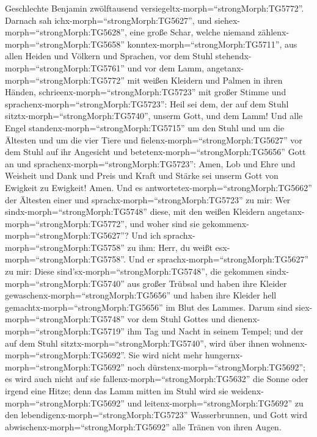 Geschlechte Benjamin zwölftausend
versiegeltx-morph=``strongMorph:TG5772''.  Darnach sah
ichx-morph=``strongMorph:TG5627'', und
siehex-morph=``strongMorph:TG5628'', eine große Schar, welche niemand
zählenx-morph=``strongMorph:TG5658''
konntex-morph=``strongMorph:TG5711'', aus allen Heiden und Völkern und
Sprachen, vor dem Stuhl stehendx-morph=``strongMorph:TG5761'' und vor
dem Lamm, angetanx-morph=``strongMorph:TG5772'' mit weißen Kleidern und
Palmen in ihren Händen, 
schrieenx-morph=``strongMorph:TG5723'' mit großer Stimme und
sprachenx-morph=``strongMorph:TG5723'': Heil sei dem, der auf dem Stuhl
sitztx-morph=``strongMorph:TG5740'', unserm Gott, und dem Lamm!
 Und alle Engel standenx-morph=``strongMorph:TG5715'' um
den Stuhl und um die Ältesten und um die vier Tiere und
fielenx-morph=``strongMorph:TG5627'' vor dem Stuhl auf ihr Angesicht und
betetenx-morph=``strongMorph:TG5656'' Gott an  und
sprachenx-morph=``strongMorph:TG5723'': Amen, Lob und Ehre und Weisheit
und Dank und Preis und Kraft und Stärke sei unserm Gott von Ewigkeit zu
Ewigkeit! Amen.  Und es
antwortetex-morph=``strongMorph:TG5662'' der Ältesten einer und
sprachx-morph=``strongMorph:TG5723'' zu mir: Wer
sindx-morph=``strongMorph:TG5748'' diese, mit den weißen Kleidern
angetanx-morph=``strongMorph:TG5772'', und woher sind sie
gekommenx-morph=``strongMorph:TG5627''?  Und ich
sprachx-morph=``strongMorph:TG5758'' zu ihm: Herr, du weißt
esx-morph=``strongMorph:TG5758''. Und er
sprachx-morph=``strongMorph:TG5627'' zu mir: Diese
sind'sx-morph=``strongMorph:TG5748'', die gekommen
sindx-morph=``strongMorph:TG5740'' aus großer Trübsal und haben ihre
Kleider gewaschenx-morph=``strongMorph:TG5656'' und haben ihre Kleider
hell gemachtx-morph=``strongMorph:TG5656'' im Blut des Lammes.
 Darum sind siex-morph=``strongMorph:TG5748'' vor dem Stuhl
Gottes und dienenx-morph=``strongMorph:TG5719'' ihm Tag und Nacht in
seinem Tempel; und der auf dem Stuhl
sitztx-morph=``strongMorph:TG5740'', wird über ihnen
wohnenx-morph=``strongMorph:TG5692''.  Sie wird nicht mehr
hungernx-morph=``strongMorph:TG5692'' noch
dürstenx-morph=``strongMorph:TG5692''; es wird auch nicht auf sie
fallenx-morph=``strongMorph:TG5632'' die Sonne oder irgend eine Hitze;
 denn das Lamm mitten im Stuhl wird sie
weidenx-morph=``strongMorph:TG5692'' und
leitenx-morph=``strongMorph:TG5692'' zu den
lebendigenx-morph=``strongMorph:TG5723'' Wasserbrunnen, und Gott wird
abwischenx-morph=``strongMorph:TG5692'' alle Tränen von ihren Augen.

